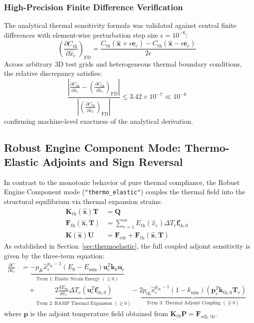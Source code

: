\documentclass[11pt, a4paper]{article}
\begin{document}
\subsubsection{High-Precision Finite Difference Verification}
The analytical thermal sensitivity formula was validated against central finite differences with element-wise perturbation step size $\epsilon = 10^{-6}$:
\begin{equation}
\left( \frac{\partial C_{\text{th}}}{\partial \hat{x}_e} \right)_{\text{FD}} = \frac{C_{\text{th}}(\hat{\mathbf{x}} + \epsilon \mathbf{e}_e) - C_{\text{th}}(\hat{\mathbf{x}} - \epsilon \mathbf{e}_e)}{2\epsilon}
\end{equation}
Across arbitrary 3D test grids and heterogeneous thermal boundary conditions, the relative discrepancy satisfies:
\begin{equation}
\frac{\left| \frac{\partial C_{\text{th}}}{\partial \hat{x}_e} - \left( \frac{\partial C_{\text{th}}}{\partial \hat{x}_e} \right)_{\text{FD}} \right|}{\left| \left( \frac{\partial C_{\text{th}}}{\partial \hat{x}_e} \right)_{\text{FD}} \right|} \le 3.42 \times 10^{-7} \ll 10^{-6}
\end{equation}
confirming machine-level exactness of the analytical derivation.

\subsection{Robust Engine Component Mode: Thermo-Elastic Adjoints and Sign Reversal}
\label{sec:robust_engine}
In contrast to the monotonic behavior of pure thermal compliance, the Robust Engine Component mode (\texttt{"thermo\_elastic"}) couples the thermal field into the structural equilibrium via thermal expansion strains:
\begin{align}
\mathbf{K}_{\text{th}}(\hat{\mathbf{x}}) \mathbf{T} &= \mathbf{Q} \\
\mathbf{F}_{\text{th}}(\hat{\mathbf{x}}, \mathbf{T}) &= \sum_{e=1}^m E_{\text{th}}(\hat{x}_e) \Delta T_e \mathbf{f}_{\text{th}, 0}^e \\
\mathbf{K}(\hat{\mathbf{x}}) \mathbf{U} &= \mathbf{F}_{\text{ext}} + \mathbf{F}_{\text{th}}(\hat{\mathbf{x}}, \mathbf{T})
\end{align}
As established in Section~\ref{sec:thermoelastic}, the full coupled adjoint sensitivity is given by the three-term equation:
\begin{align}
\frac{\partial C}{\partial \hat{x}_e} &= \underbrace{- p_K \hat{x}_e^{p_K - 1} (E_0 - E_{\min}) \mathbf{u}_e^T \mathbf{k}_0 \mathbf{u}_e}_{\text{Term 1: Elastic Strain Energy } (\le 0)} \nonumber \\[6pt]
&\quad + \underbrace{2 \frac{dE_{\text{th}}}{d\hat{x}_e} \Delta T_e (\mathbf{u}_e^T \mathbf{f}_{\text{th}, 0}^e)}_{\text{Term 2: RAMP Thermal Expansion } (\gtrless 0)} - \underbrace{2 p_{\text{th}} \hat{x}_e^{p_{\text{th}} - 1} (1 - k_{\min}) (\mathbf{p}_e^T \mathbf{k}_{\text{th}, 0} \mathbf{T}_e)}_{\text{Term 3: Thermal Adjoint Coupling } (\gtrless 0)}
\end{align}
where $\mathbf{p}$ is the adjoint temperature field obtained from $\mathbf{K}_{\text{th}} \mathbf{P} = \mathbf{F}_{\text{adj, th}}$.
\end{document}
